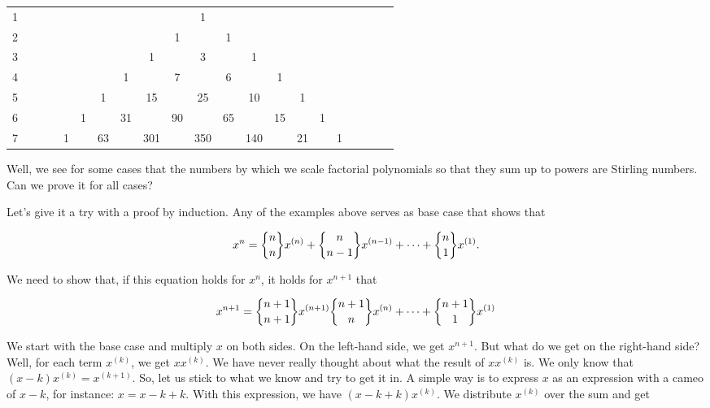\documentclass[tikz]{scrreprt}
\begin{document}
\begin{tabular}{l c c c c c c c c c c c c c c c c c c c c}
1 &   &   &   &   &    &    &    &     &     &   1 &     &     &    &    &    &   &   &   &   &  \\
2 &   &   &   &   &    &    &    &     &   1 &     &   1 &     &    &    &    &   &   &   &   &  \\
3 &   &   &   &   &    &    &    &   1 &     &   3 &     &   1 &    &    &    &   &   &   &   &  \\
4 &   &   &   &   &    &    &  1 &     &   7 &     &   6 &     &  1 &    &    &   &   &   &   &  \\
5 &   &   &   &   &    &  1 &    &  15 &     &  25 &     &  10 &    &  1 &    &   &   &   &   &  \\
6 &   &   &   &   &  1 &    & 31 &     &  90 &     &  65 &     & 15 &    &  1 &   &   &   &   &  \\   
7 &   &   &   & 1 &    & 63 &    & 301 &     & 350 &     & 140 &    & 21 &    & 1 &   &   &   &  
\end{tabular}

Well, we see for some cases that the numbers by which
we scale factorial polynomials so that
they sum up to powers are
Stirling numbers. Can we prove it for all cases?

Let's give it a try with a proof by induction.
Any of the examples above serves as base case that shows that

\begin{equation}
x^n = \stirlingTwo{n}{n}x^{(n)} + \stirlingTwo{n}{n-1}x^{(n-1)} + \dots + \stirlingTwo{n}{1}x^{(1)}.
\end{equation}

We need to show that, if this equation holds for $x^n$, it holds for $x^{n+1}$ that

\begin{equation}
x^{n+1} = \stirlingTwo{n+1}{n+1}x^{(n+1)}
          \stirlingTwo{n+1}{n}x^{(n)} + \dots + 
          \stirlingTwo{n+1}{1}x^{(1)}
\end{equation}

We start with the base case and multiply $x$ on both sides.
On the left-hand side, we get $x^{n+1}$. But what do we get
on the right-hand side?
Well, for each term $x^{(k)}$, we get $xx^{(k)}$.
We have never really thought about what the result of $xx^{(k)}$ is.
We only know that $(x-k)x^{(k)} = x^{(k+1)}$.
So, let us stick to what we know and try to get it in.
A simple way is to express $x$ as an expression with a cameo of $x-k$,
for instance: $x = x-k+k$.
With this expression, we have $(x-k+k)x^{(k)}$.
We distribute $x^{(k)}$ over the sum and get
\end{document}
